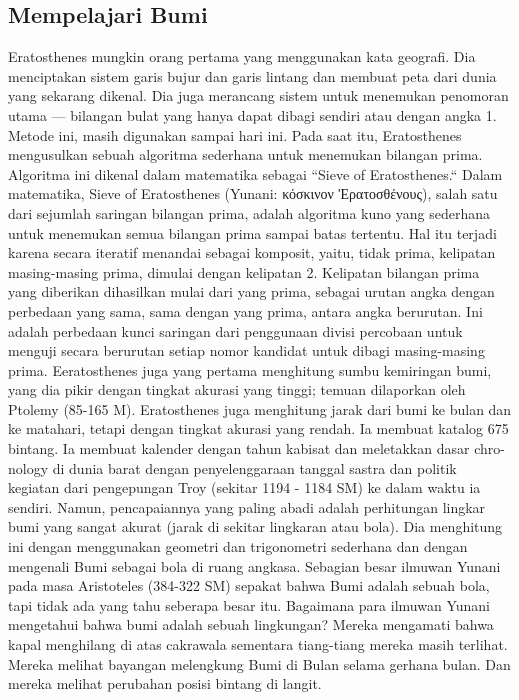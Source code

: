 \subsection{Mempelajari Bumi}
Eratosthenes mungkin orang pertama yang menggunakan kata geografi. Dia menciptakan sistem garis bujur dan garis lintang dan membuat peta dari dunia yang sekarang dikenal. Dia juga merancang sistem untuk menemukan penomoran utama — bilangan bulat yang hanya dapat dibagi sendiri atau dengan angka 1. Metode ini, masih digunakan sampai hari ini.
Pada saat itu, Eratosthenes mengusulkan sebuah algoritma sederhana untuk menemukan bilangan prima. Algoritma ini dikenal dalam matematika sebagai ``Sieve of Eratosthenes.``
Dalam matematika, Sieve of Eratosthenes (Yunani: κόσκινον Ἐρατοσθένους), salah satu dari sejumlah saringan bilangan prima, adalah algoritma kuno yang sederhana untuk menemukan semua bilangan prima sampai batas tertentu. Hal itu terjadi karena secara iteratif menandai sebagai komposit, yaitu, tidak prima, kelipatan masing-masing prima, dimulai dengan kelipatan 2. Kelipatan bilangan prima yang diberikan dihasilkan mulai dari yang prima, sebagai urutan angka dengan perbedaan yang sama, sama dengan yang prima, antara angka berurutan. Ini adalah perbedaan kunci saringan dari penggunaan divisi percobaan untuk menguji secara berurutan setiap nomor kandidat untuk dibagi masing-masing prima.
Eeratosthenes juga yang pertama menghitung sumbu kemiringan bumi, yang dia pikir dengan tingkat akurasi yang tinggi; temuan dilaporkan oleh Ptolemy (85-165 M). Eratosthenes juga menghitung jarak dari bumi ke bulan dan ke matahari, tetapi dengan tingkat akurasi yang rendah. Ia membuat katalog 675 bintang. Ia membuat kalender dengan tahun kabisat dan meletakkan dasar chro- nology di dunia barat dengan penyelenggaraan tanggal sastra dan politik kegiatan dari pengepungan Troy (sekitar 1194 - 1184 SM) ke dalam waktu ia sendiri.
Namun, pencapaiannya yang paling abadi adalah perhitungan lingkar bumi yang sangat akurat (jarak di sekitar lingkaran atau bola). Dia menghitung ini dengan menggunakan geometri dan trigonometri sederhana dan dengan mengenali Bumi sebagai bola di ruang angkasa. Sebagian besar ilmuwan Yunani pada masa Aristoteles (384-322 SM) sepakat bahwa Bumi adalah sebuah bola, tapi tidak ada yang tahu seberapa besar itu.
Bagaimana para ilmuwan Yunani mengetahui bahwa bumi adalah sebuah lingkungan? Mereka mengamati bahwa kapal menghilang di atas cakrawala sementara tiang-tiang mereka masih terlihat. Mereka melihat bayangan melengkung Bumi di Bulan selama gerhana bulan. Dan mereka melihat perubahan posisi bintang di langit.

